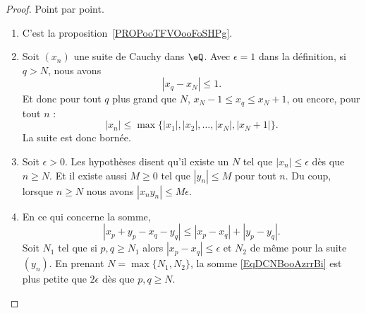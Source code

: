\begin{proof}
    Point par point.
    \begin{enumerate}
        \item
            C'est la proposition~\ref{PROPooTFVOooFoSHPg}.
        \item
            Soit \( (x_n)\) une suite de Cauchy dans \( \eQ\). Avec \( \epsilon=1\) dans la définition, si \( q>N\), nous avons
            \begin{equation}
                | x_q-x_{N} |\leq 1.
            \end{equation}
            Et donc pour tout \( q\) plus grand que \( N\), \( x_N-1\leq x_q\leq x_N+1\), ou encore, pour tout \( n\) :
            \begin{equation}
                | x_n |\leq\max\{ | x_1 |,| x_2 |,\ldots,| x_N |,| x_N+1 | \}.
            \end{equation}
            La suite est donc bornée.
        \item
            Soit \(\epsilon>0\). Les hypothèses disent qu'il existe un \( N\) tel que \( | x_n |\leq \epsilon\) dès que \( n\geq N\). Et il existe aussi \( M\geq 0\) tel que \( | y_n |\leq M\) pour tout \( n\). Du coup, lorsque \( n\geq N\) nous avons \( | x_ny_n |\leq M\epsilon\).
        \item
            En ce qui concerne la somme,
            \begin{equation}        \label{EqDCNBooAzrrBi}
                | x_p+y_p-x_q-y_q |\leq | x_p-x_q |+| y_p-y_q |.
            \end{equation}
            Soit \( N_1\) tel que si \( p,q\geq N_1\) alors \( | x_p-x_q |\leq \epsilon\) et \( N_2\) de même pour la suite \( (y_n)\). En prenant \( N=\max\{ N_1,N_2 \}\), la somme \eqref{EqDCNBooAzrrBi} est plus petite que \( 2\epsilon\) dès que \( p,q\geq N\).


\end{enumerate}
\end{proof}
